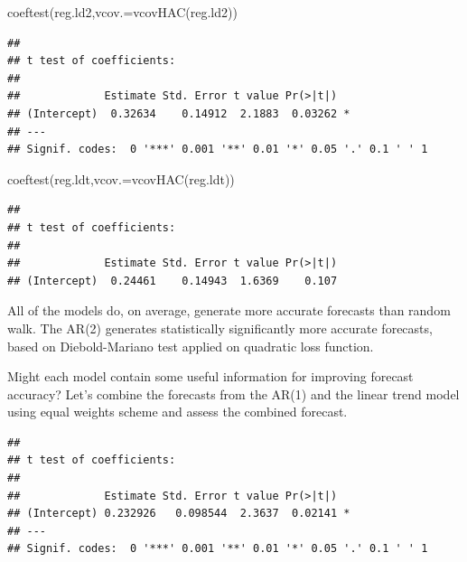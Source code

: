\documentclass[
  12pt,
  oneside]{book}
\newenvironment{Shaded}{\begin{snugshade}}{\end{snugshade}}
\newcommand{\AttributeTok}[1]{\textcolor[rgb]{0.77,0.63,0.00}{#1}}
\newcommand{\DecValTok}[1]{\textcolor[rgb]{0.00,0.00,0.81}{#1}}
\newcommand{\FunctionTok}[1]{\textcolor[rgb]{0.00,0.00,0.00}{#1}}
\newcommand{\NormalTok}[1]{#1}
\newcommand{\OtherTok}[1]{\textcolor[rgb]{0.56,0.35,0.01}{#1}}
\newcommand{\SpecialCharTok}[1]{\textcolor[rgb]{0.00,0.00,0.00}{#1}}
\begin{document}
\begin{Shaded}
\begin{Highlighting}[]
\FunctionTok{coeftest}\NormalTok{(reg.ld2,}\AttributeTok{vcov.=}\FunctionTok{vcovHAC}\NormalTok{(reg.ld2))}
\end{Highlighting}
\end{Shaded}

\begin{verbatim}
## 
## t test of coefficients:
## 
##             Estimate Std. Error t value Pr(>|t|)  
## (Intercept)  0.32634    0.14912  2.1883  0.03262 *
## ---
## Signif. codes:  0 '***' 0.001 '**' 0.01 '*' 0.05 '.' 0.1 ' ' 1
\end{verbatim}

\begin{Shaded}
\begin{Highlighting}[]
\FunctionTok{coeftest}\NormalTok{(reg.ldt,}\AttributeTok{vcov.=}\FunctionTok{vcovHAC}\NormalTok{(reg.ldt))}
\end{Highlighting}
\end{Shaded}

\begin{verbatim}
## 
## t test of coefficients:
## 
##             Estimate Std. Error t value Pr(>|t|)
## (Intercept)  0.24461    0.14943  1.6369    0.107
\end{verbatim}

All of the models do, on average, generate more accurate forecasts than random walk. The AR(2) generates statistically significantly more accurate forecasts, based on Diebold-Mariano test applied on quadratic loss function.

Might each model contain some useful information for improving forecast accuracy? Let's combine the forecasts from the AR(1) and the linear trend model using equal weights scheme and assess the combined forecast.

\begin{Shaded}
\end{Shaded}

\begin{verbatim}
## 
## t test of coefficients:
## 
##             Estimate Std. Error t value Pr(>|t|)  
## (Intercept) 0.232926   0.098544  2.3637  0.02141 *
## ---
## Signif. codes:  0 '***' 0.001 '**' 0.01 '*' 0.05 '.' 0.1 ' ' 1
\end{verbatim}
\end{document}
